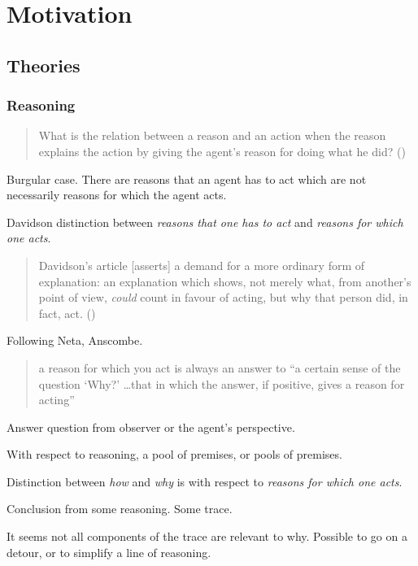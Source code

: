 \chapter{Motivation}
\label{cha:motivation}

\section{Theories}

\subsection{Reasoning}

\begin{note}
  \begin{quote}
    What is the relation between a reason and an action when the reason explains the action by giving the agent's reason for doing what he did?%
    \mbox{}\hfill\mbox{({\citeyear[685]{Davidson:1963aa}})}
  \end{quote}

  Burgular case.
  There are reasons that an agent has to act which are not necessarily reasons for which the agent acts.

  Davidson distinction between \emph{reasons that one has to act} and \emph{reasons for which one acts}.

  \begin{quote}
    Davidson's article [asserts] a demand for a more ordinary form of explanation: an explanation which shows, not merely what, from another's point of view, \emph{could} count in favour of acting, but why that person did, in fact, act.%
    \mbox{}\hfill\mbox{(\citeyear[417]{Hieronymi:2011aa})}
  \end{quote}

  Following Neta, Anscombe.

  \begin{quote}
    a reason for which you act is always an answer to “a certain sense of the question ‘Why?' \dots that in which the answer, if positive, gives a reason for acting”
  \end{quote}

  Answer question from observer or the agent's perspective.

  With respect to reasoning, a pool of premises, or pools of premises.

  Distinction between \emph{how} and \emph{why} is with respect to \emph{reasons for which one acts}.

  Conclusion from some reasoning.
  Some trace.

  It seems not all components of the trace are relevant to why.
  Possible to go on a detour, or to simplify a line of reasoning.
\end{note}

